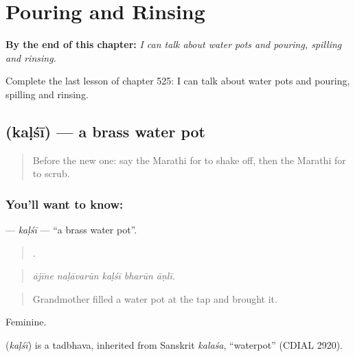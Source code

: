 
\chapter{Pouring and Rinsing}
\label{ch:mr-pouring-and-rinsing}

\begin{chapteropening}
\textbf{By the end of this chapter:} \emph{I can talk about water pots and pouring, spilling and rinsing.}

Complete the last lesson of chapter 525: I can talk about water pots and pouring, spilling and rinsing.
\end{chapteropening}

\section[\texorpdfstring{\mr{कळशी} (kaḷśī)}{कळशी (kaḷśī)}]{ (kaḷśī) — a brass water pot}

\label{lesson:MR-C525-kalsi}



\begin{quote}
Before the new one: say the Marathi for to shake off, then the Marathi for to scrub.
\end{quote}

\subsection*{You'll want to know: }
\textbf{} — \emph{kaḷśī} — \textquotedblleft{}a brass water pot\textquotedblright{}.

\begin{quote}
    .
\end{quote}

\begin{quote}
\emph{ājīne naḷāvarūn kaḷśī bharūn āṇlī.}
\end{quote}

\begin{quote}
Grandmother filled a water pot at the tap and brought it.
\end{quote}

Feminine.

\begin{cousinweb}
\textbf{} (\emph{kaḷśī}) is a tadbhava, inherited from Sanskrit \emph{kalaśa}, \textquotedblleft{}waterpot\textquotedblright{} (CDIAL 2920).
\end{cousinweb}

